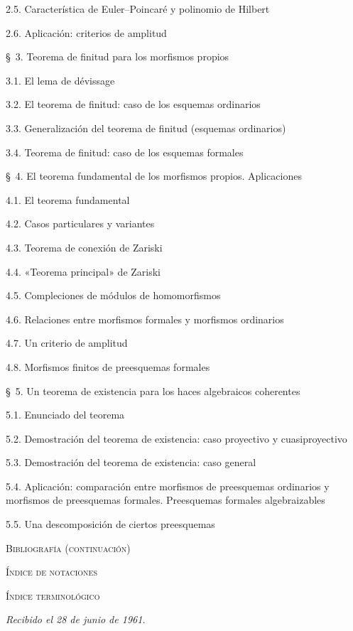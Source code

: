 \documentclass[oneside]{amsart}
\newcommand{\oldpage}[2][]{{\marginnote{\normalfont\textbf{#1}~|~#2}}\ignorespaces}
\begin{document}
\begin{flushleft}
2.5. Característica de Euler--Poincaré y polinomio de Hilbert 

2.6. Aplicación: criterios de amplitud 

\medskip
\S~3. Teorema de finitud para los morfismos propios 

3.1. El lema de dévissage 

3.2. El teorema de finitud: caso de los esquemas ordinarios 

3.3. Generalización del teorema de finitud (esquemas ordinarios) 

3.4. Teorema de finitud: caso de los esquemas formales 

\medskip
\S~4. El teorema fundamental de los morfismos propios. Aplicaciones 

4.1. El teorema fundamental 

4.2. Casos particulares y variantes 

4.3. Teorema de conexión de Zariski 

4.4. «Teorema principal» de Zariski 

4.5. Compleciones de módulos de homomorfismos 

4.6. Relaciones entre morfismos formales y morfismos ordinarios 

4.7. Un criterio de amplitud 

4.8. Morfismos finitos de preesquemas formales 

\oldpage[III]{167}

\S~5. Un teorema de existencia para los haces algebraicos coherentes 

5.1. Enunciado del teorema 

5.2. Demostración del teorema de existencia: caso proyectivo y cuasiproyectivo

5.3. Demostración del teorema de existencia: caso general 

5.4. Aplicación: comparación entre morfismos de preesquemas ordinarios y
morfismos de preesquemas formales. Preesquemas formales algebraizables 

5.5. Una descomposición de ciertos preesquemas 

\medskip
\textsc{Bibliografía (continuación)} 

\textsc{Índice de notaciones} 

\textsc{Índice terminológico} 

\begin{flushright}
\emph{Recibido el 28 de junio de 1961.}
\end{flushright}
\end{flushleft}
\end{document}
